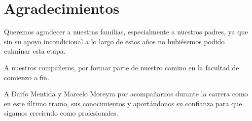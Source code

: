 \chapter*{Agradecimientos}

Queremos agradecer a nuestras familias, especialmente a nuestros padres, ya que sin su apoyo incondicional a lo largo de estos años no hubiésemos podido culminar esta etapa.

A nuestros compañeros, por formar parte de nuestro camino en la facultad de comienzo a fin.

A Darío Mentida y Marcelo Moreyra por acompañarnos durante la carrera como en este último tramo,
sus conocimientos y aportándonos su confianza para que sigamos creciendo como profesionales.

